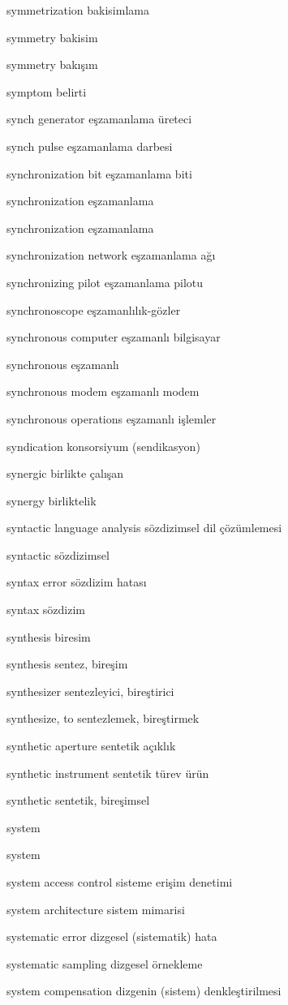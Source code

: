 \documentclass[12pt,fleqn]{article}\usepackage{../../common}
\begin{document}
symmetrization bakisimlama

symmetry bakisim

symmetry bakışım

symptom belirti

synch generator eşzamanlama üreteci

synch pulse eşzamanlama darbesi

synchronization bit eşzamanlama biti

synchronization eşzamanlama

synchronization eşzamanlama

synchronization network eşzamanlama ağı

synchronizing pilot eşzamanlama pilotu

synchronoscope eşzamanlılık-gözler

synchronous computer eşzamanlı bilgisayar

synchronous eşzamanlı

synchronous modem eşzamanlı modem

synchronous operations eşzamanlı işlemler

syndication konsorsiyum (sendikasyon)

synergic birlikte çalışan

synergy birliktelik

syntactic language analysis sözdizimsel dil çözümlemesi

syntactic sözdizimsel

syntax error sözdizim hatası

syntax sözdizim

synthesis biresim

synthesis sentez, bireşim

synthesizer sentezleyici, bireştirici

synthesize, to sentezlemek, bireştirmek

synthetic aperture sentetik açıklık

synthetic instrument sentetik türev ürün

synthetic sentetik, bireşimsel

system

system

system access control sisteme erişim denetimi

system architecture sistem mimarisi

systematic error dizgesel (sistematik) hata

systematic sampling dizgesel örnekleme

system compensation dizgenin (sistem) denkleştirilmesi
\end{document}
